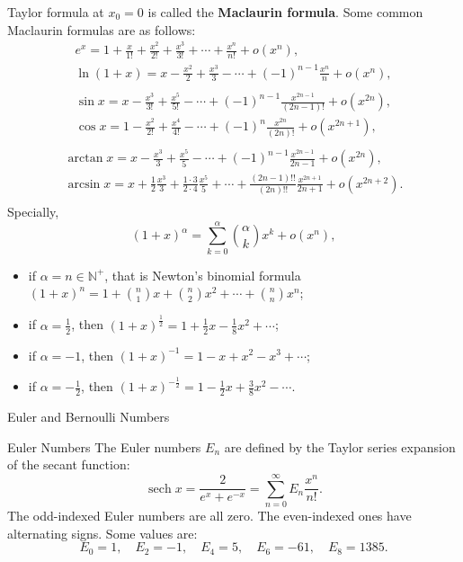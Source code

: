 \documentclass[11pt]{../../TexTemplate/elegantbook}
\begin{document}
Taylor formula at \(x_{0} = 0\) is called the \textbf{Maclaurin formula}.
Some common Maclaurin formulas are as follows:
\begin{gather*}
    e^{x} = 1 + \frac{x}{1!} + \frac{x^2}{2!} + \frac{x^3}{3!} + \cdots + \frac{x^n}{n!} + o(x^n), \\
    \ln(1+x) = x - \frac{x^2}{2} + \frac{x^3}{3} - \cdots + (-1)^{n-1}\frac{x^n}{n} + o(x^n), \\
\end{gather*}
\begin{gather*}
    \sin x = x - \frac{x^3}{3!} + \frac{x^5}{5!} - \cdots + (-1)^{n-1}\frac{x^{2n-1}}{(2n-1)!} + o(x^{2n}), \\
    \cos x = 1 - \frac{x^2}{2!} + \frac{x^4}{4!} - \cdots + (-1)^{n}\frac{x^{2n}}{(2n)!} + o(x^{2n+1}), \\
\end{gather*}
\begin{gather*}
    \arctan x = x - \frac{x^3}{3} + \frac{x^5}{5} - \cdots + (-1)^{n-1}\frac{x^{2n-1}}{2n-1} + o(x^{2n}), \\
    \arcsin x = x + \frac{1}{2}\frac{x^3}{3} + \frac{1\cdot 3}{2\cdot 4}\frac{x^5}{5} + \cdots + 
        \frac{(2n-1)!!}{(2n)!!}\frac{x^{2n+1}}{2n+1} + o(x^{2n+2}). \\
\end{gather*}
Specially, 
\[
(1+x)^{\alpha} = \sum_{k=0}^{\alpha} \binom{\alpha}{k} x^k + o(x^{n}),
\]
\begin{itemize}
    \item if \(\alpha = n\in \mathbb{N}^{+}\), that is Newton's binomial formula 
        \((1+x)^n = 1 + \binom{n}{1}x + \binom{n}{2}x^2 + \cdots + \binom{n}{n}x^n\); 
    \item if \(\alpha = \frac{1}{2}\), then
        \((1+x)^{\frac{1}{2}} = 1 + \frac{1}{2}x - \frac{1}{8}x^2 + \cdots\);
    \item if \(\alpha = -1\), then
        \((1+x)^{-1} = 1 - x + x^2 - x^3 + \cdots\);
    \item if \(\alpha = -\frac{1}{2}\), then
        \((1+x)^{-\frac{1}{2}} = 1 - \frac{1}{2}x + \frac{3}{8}x^2 - \cdots\).
\end{itemize}

\begin{leftbarTitle}{Euler and Bernoulli Numbers}\end{leftbarTitle}
\begin{definition}{Euler Numbers}
    The Euler numbers \(E_n\) are defined by the Taylor series expansion of the secant function:
    \[
        \operatorname{sech} x = \frac{2}{e^x + e^{-x}} = \sum_{n=0}^{\infty} E_n \frac{x^n}{n!}.
    \]
    The odd-indexed Euler numbers are all zero. 
    The even-indexed ones have alternating signs. Some values are:
    \[
        E_0 = 1, \quad E_2 = -1, \quad E_4 = 5, \quad E_6 = -61, \quad E_8 = 1385.
    \]
\end{definition}
\end{document}

